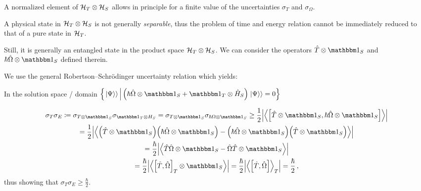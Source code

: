 A normalized element of $\mathcal{H}_T \otimes \mathcal{H}_S$ allows in principle for a finite value
of the uncertainties $\sigma_{T}$ and $\sigma_{\Omega}$.

A physical state in $\mathcal{H}_T \otimes \mathcal{H}_S$ is not generally
\emph{separable},
thus
the problem of time and energy relation cannot be immediately reduced to that of
a pure state in $\mathcal{H}_T$.

Still, it is generally an entangled state in the product space $\mathcal{H}_T \otimes \mathcal{H}_S$.
We can consider the
operators $\op{T} \ox \idop_{S}$ and $\hbar\op{\Omega} \ox \idop_{S}$
defined therein.

We use the general Robertson--Schr\"{o}dinger uncertainty relation which yields:

In the solution space / domain $\setof{%
\dket{\Psi} \, \middle| \, \qty(\hbar\op{\Omega} \ox \idop_S + \idop_T \ox \op{H}_S) \dket{\Psi} = 0%
}$

\begin{multline}
  \sigma_T \sigma_E \eqbydef
  \sigma_{T \ox \idop_S} \sigma_{\idop_T \ox H_S}         =
  \sigma_{T \ox \idop_S} \sigma_{\hbar\Omega \ox \idop_S} \geq
  \frac{1}{2} \abs{\expval{\comm
    {\op{T}\ox\idop_S} {\hbar\op{\Omega}\ox\idop_S}
  }}
  \\
  = \frac{1}{2} \abs{\expval{
      \qty(\op{T}\ox\idop_S) \qty(\hbar\op{\Omega}\ox\idop_S) -
      \qty(\hbar\op{\Omega}\ox\idop_S) \qty(\op{T}\ox\idop_S)
    }}
  \\
  = \frac{\hbar}{2} \abs{\expval{
    \op{T}\op{\Omega}\ox\idop_S - \op{\Omega}\op{T}\ox\idop_S
  }}
  \\
  = \frac{\hbar}{2} \abs{\expval{
    \comm{\op{T}}{\op{\Omega}}_T \ox \idop_S
  }} =
  \frac{\hbar}{2} \abs{\expval{\comm
    {\op{T}}{\op{\Omega}}
  }_T} =
  \frac{\hbar}{2}
  \,\text{,}
\end{multline}
thus showing that $\sigma_T \sigma_E \geq \frac{\hbar}{2}$.




